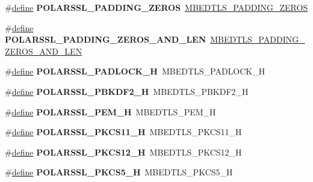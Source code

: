 \begin{DoxyCompactItemize}
\#\hyperlink{structdefine}{define} {\bfseries P\+O\+L\+A\+R\+S\+S\+L\+\_\+\+P\+A\+D\+D\+I\+N\+G\+\_\+\+Z\+E\+R\+OS}~\hyperlink{cipher_8h_a5b57bc07ab7c430e9b4f29f3a5729837a339efb60a69e4b033a106c61cd8691e4}{M\+B\+E\+D\+T\+L\+S\+\_\+\+P\+A\+D\+D\+I\+N\+G\+\_\+\+Z\+E\+R\+OS}
\item 
\mbox{\label{compat-1_83_8h_ac9040b33da9acb48df8cd8f92bc57db3}} 
\#\hyperlink{structdefine}{define} {\bfseries P\+O\+L\+A\+R\+S\+S\+L\+\_\+\+P\+A\+D\+D\+I\+N\+G\+\_\+\+Z\+E\+R\+O\+S\+\_\+\+A\+N\+D\+\_\+\+L\+EN}~\hyperlink{cipher_8h_a5b57bc07ab7c430e9b4f29f3a5729837a93944bd7edfd0c6b6f362eb6eef1b4fc}{M\+B\+E\+D\+T\+L\+S\+\_\+\+P\+A\+D\+D\+I\+N\+G\+\_\+\+Z\+E\+R\+O\+S\+\_\+\+A\+N\+D\+\_\+\+L\+EN}
\item 
\mbox{\label{compat-1_83_8h_ae84cd21d98c1ad2613d4cee27fe8b24f}} 
\#\hyperlink{structdefine}{define} {\bfseries P\+O\+L\+A\+R\+S\+S\+L\+\_\+\+P\+A\+D\+L\+O\+C\+K\+\_\+H}~M\+B\+E\+D\+T\+L\+S\+\_\+\+P\+A\+D\+L\+O\+C\+K\+\_\+H
\item 
\mbox{\label{compat-1_83_8h_a3e8653295edfb52ea8aeef4af2702c1f}} 
\#\hyperlink{structdefine}{define} {\bfseries P\+O\+L\+A\+R\+S\+S\+L\+\_\+\+P\+B\+K\+D\+F2\+\_\+H}~M\+B\+E\+D\+T\+L\+S\+\_\+\+P\+B\+K\+D\+F2\+\_\+H
\item 
\mbox{\label{compat-1_83_8h_a33979fc7b448b271ac0d4975e39000eb}} 
\#\hyperlink{structdefine}{define} {\bfseries P\+O\+L\+A\+R\+S\+S\+L\+\_\+\+P\+E\+M\+\_\+H}~M\+B\+E\+D\+T\+L\+S\+\_\+\+P\+E\+M\+\_\+H
\item 
\mbox{\label{compat-1_83_8h_a72ca340d801e3320435c0120961ef921}} 
\#\hyperlink{structdefine}{define} {\bfseries P\+O\+L\+A\+R\+S\+S\+L\+\_\+\+P\+K\+C\+S11\+\_\+H}~M\+B\+E\+D\+T\+L\+S\+\_\+\+P\+K\+C\+S11\+\_\+H
\item 
\mbox{\label{compat-1_83_8h_a9c0bbc259844d11c6d86e0d113b3554e}} 
\#\hyperlink{structdefine}{define} {\bfseries P\+O\+L\+A\+R\+S\+S\+L\+\_\+\+P\+K\+C\+S12\+\_\+H}~M\+B\+E\+D\+T\+L\+S\+\_\+\+P\+K\+C\+S12\+\_\+H
\item 
\mbox{\label{compat-1_83_8h_a0d9c64ca33f9f03e61d981e63327a7a5}} 
\#\hyperlink{structdefine}{define} {\bfseries P\+O\+L\+A\+R\+S\+S\+L\+\_\+\+P\+K\+C\+S5\+\_\+H}~M\+B\+E\+D\+T\+L\+S\+\_\+\+P\+K\+C\+S5\+\_\+H

\end{DoxyCompactItemize}
